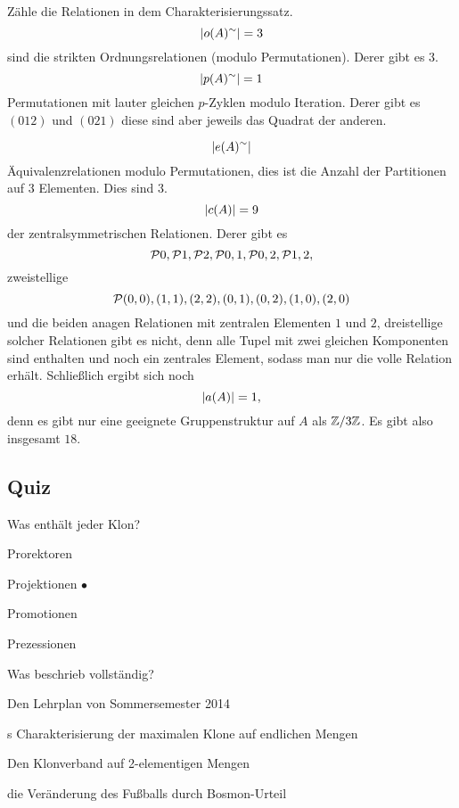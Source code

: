 \documentclass{book}
\begin{document}
\begin{solution}
Zähle die Relationen in dem Charakterisierungssatz.
$$\left|o(A)^{\sim}\right|=3$$
sind die strikten Ordnungsrelationen (modulo Permutationen). Derer gibt es $3$.
$$\left|p(A)^{\sim}\right|=1$$
Permutationen mit lauter gleichen $p$-Zyklen modulo Iteration. Derer gibt es $(012)$ und $(021)$ diese sind aber jeweils das Quadrat der anderen.

$$\left|e(A)^{\sim}\right|$$
Äquivalenzrelationen modulo Permutationen, dies ist die Anzahl der Partitionen auf $3$ Elementen. Dies sind $3$.
$$\left|c(A)\right|=9$$
der zentralsymmetrischen Relationen. Derer gibt es
$$\set{0},\set{1},\set{2}, \set{0,1}, \set{0,2}, \set{1,2},$$ zweistellige $$\set{(0,0),(1,1),(2,2),(0,1),(0,2),(1,0),(2,0)}$$
und die beiden anagen Relationen mit zentralen Elementen $1$ und $2$, dreistellige solcher Relationen gibt es nicht, denn alle Tupel mit zwei gleichen Komponenten sind enthalten und noch ein zentrales Element, sodass man nur die volle Relation erhält.    
Schließlich ergibt sich noch
$$
\left|a(A)\right|=1,
$$
denn es gibt nur eine geeignete Gruppenstruktur auf $A$ als $\mathbb{Z}/ 3\mathbb{Z}$.
Es gibt also insgesamt $18$.
\end{solution}

\subsection{Quiz}

\begin{exercise}
Was enthält jeder Klon?
\begin{tasks}
        \item Prorektoren
        \item Projektionen $\bullet$
        \item Promotionen
        \item Prezessionen
\end{tasks}

\end{exercise}

\begin{exercise}
Was beschrieb  vollständig?
\begin{tasks}
    \item Den Lehrplan von Sommersemester 2014
    \item {}s Charakterisierung der maximalen Klone auf endlichen Mengen
    \item Den Klonverband auf 2-elementigen Mengen
    \item die Veränderung des Fußballs durch Bosmon-Urteil    
\end{tasks}
\end{exercise}
\end{document}
